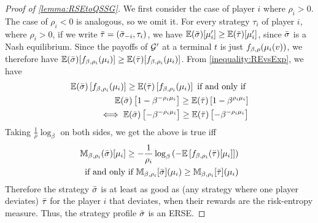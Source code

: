 \begin{proof}[Proof of \cref{lemma:RSEtoQSSG}]
    We first consider the case of player $i$ where $\rho_i>0$. The case of $\rho_i<0$ is analogous, so we omit it. 
    For every strategy $\tau_i$ of player $i$, where $\rho_i>0$, if we write ${\bar{\tau}} = ({\bar{\sigma}}_{-i}, \tau_i)$, we have 
    $\mathbb{E}({\bar{\sigma}})[\mu_i']\geq \mathbb{E}({\bar{\tau}})[\mu_i']$, since ${\bar{\sigma}}$ is a Nash equilibrium. 
    Since the payoffs of $\mathcal{G}'$ at a terminal $t$ is just $f_{\beta,\rho}(\mu_i(v))$, we therefore have $\mathbb{E}({\bar{\sigma}})[f_{\beta,\rho_i}(\mu_i)]\geq \mathbb{E}({\bar{\tau}})[f_{\beta,\rho_i}(\mu_i)]$. From  \cref{inequality:REvsExp}, we have 
    \begin{align*}
         \mathbb{E}({\bar{\sigma}})\left[f_{\beta,\rho_i}(\mu_i)\right]\geq \mathbb{E}({\bar{\tau}})\left[f_{\beta,\rho_i}(\mu_i)\right]\text{ if and only if }\\
          \mathbb{E}({\bar{\sigma}})\left[1-\beta^{-\rho_i \mu_i}\right]\geq \mathbb{E}({\bar{\tau}})\left[1-\beta^{\rho_i \mu_i}\right] \\
           \iff\mathbb{E}({\bar{\sigma}})\left[-\beta^{-\rho_i \mu_i}\right]\geq \mathbb{E}({\bar{\tau}})\left[-\beta^{-\rho_i \mu_i}\right]
    \end{align*}
Taking $\frac{1}{\rho}\log_\beta$ on both sides,   we get the above is true iff
    \begin{align*}
         \mathbb{M}_{\beta,\rho_i}({\bar{\sigma}})[\mu_i] \geq -\frac{1}{\rho_i}\log_\beta\left( -\mathbb{E}\left[f_{\beta,\rho_i}({\bar{\tau}})[\mu_i]\right]  \right)\\ \text{if and only if }\mathbb{M}_{\beta,\rho_i}[{\bar{\sigma}}](\mu_i) \geq \mathbb{M}_{\beta,\rho_i}[{\bar{\tau}}](\mu_i)     \end{align*}
      Therefore the strategy  ${\bar{\sigma}}$ is at least as good as (any strategy where one player deviates) ${\bar{\tau}}$ for the player $i$ that deviates, when their rewards are the risk-entropy measure. Thus, the strategy profile ${\bar{\sigma}}$ is an ERSE.
    

\end{proof}
